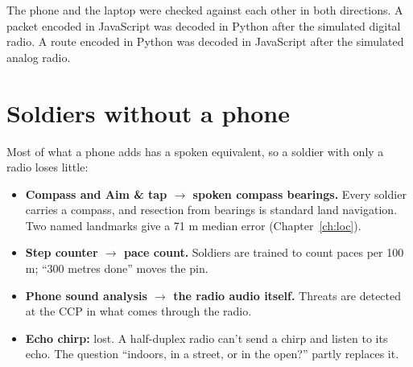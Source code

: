 The phone and the laptop were checked against each other in both directions. A packet encoded in JavaScript was decoded
in Python after the simulated digital radio. A route encoded in Python was decoded in JavaScript after the simulated
analog radio.

\section{Soldiers without a phone}

Most of what a phone adds has a spoken equivalent, so a soldier with only a radio loses little:
\begin{itemize}
  \item \textbf{Compass and Aim \& tap $\rightarrow$ spoken compass bearings.} Every soldier carries a compass, and resection
        from bearings is standard land navigation. Two named landmarks give a 71 m median error (Chapter~\ref{ch:loc}).
  \item \textbf{Step counter $\rightarrow$ pace count.} Soldiers are trained to count paces per 100 m; ``300 metres done''
        moves the pin.
  \item \textbf{Phone sound analysis $\rightarrow$ the radio audio itself.} Threats are detected at the CCP in what comes
        through the radio.
  \item \textbf{Echo chirp:} lost. A half-duplex radio can't send a chirp and listen to its echo. The question
        ``indoors, in a street, or in the open?'' partly replaces it.
\end{itemize}

